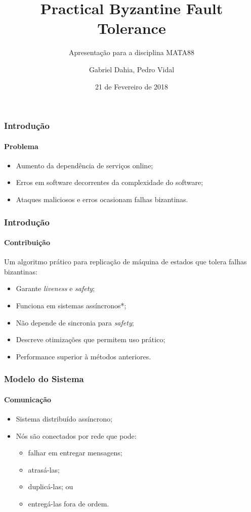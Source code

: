 \documentclass{beamer}
\title{Practical Byzantine Fault Tolerance}
\subtitle{Apresentação para a disciplina MATA88}
\author{Gabriel Dahia, Pedro Vidal}
\date{21 de Fevereiro de 2018}
\institute{Universidade Federal da Bahia}
\begin{document}
\frame{\maketitle}

\begin{frame}
  \frametitle{Introdução}
  \framesubtitle{Problema}

  \begin{itemize}
    \item
      Aumento da dependência de serviços online;

    \item
      Erros em software decorrentes da complexidade do software;

    \item
      Ataques maliciosos e erros ocasionam falhas bizantinas.
  \end{itemize}
\end{frame}

\begin{frame}
  \frametitle{Introdução}
  \framesubtitle{Contribuição}

  Um algoritmo prático para replicação de máquina de estados que tolera falhas bizantinas:
  \begin{itemize}
    \item
      Garante \textit{liveness} e \textit{safety};

    \item
      Funciona em sistemas assíncronos*;

    \item
      Não depende de sincronia para \textit{safety};

    \item
      Descreve otimizações que permitem uso prático;
      
    \item
      Performance superior à métodos anteriores.
  \end{itemize}
\end{frame}

\begin{frame}
  \frametitle{Modelo do Sistema}
  \framesubtitle{Comunicação}

  \begin{itemize}
    \item
      Sistema distribuído assíncrono;
      
    \item
      Nós são conectados por rede que pode:
      \begin{itemize}
        \item
          falhar em entregar mensagens;

        \item
          atrasá-las;

        \item
          duplicá-las; ou

        \item
          entregá-las fora de ordem.
      \end{itemize}
  \end{itemize}

\end{frame}
\end{document}

